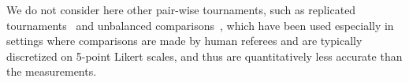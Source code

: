 We do not consider here other pair-wise tournaments, such as replicated tournaments~\cite{David1960} and unbalanced comparisons~\cite{david1987ranking}, which have been used especially in settings where comparisons are made by human referees and are typically discretized on 5-point Likert scales, and thus are quantitatively less accurate than the \toolname{} measurements.









